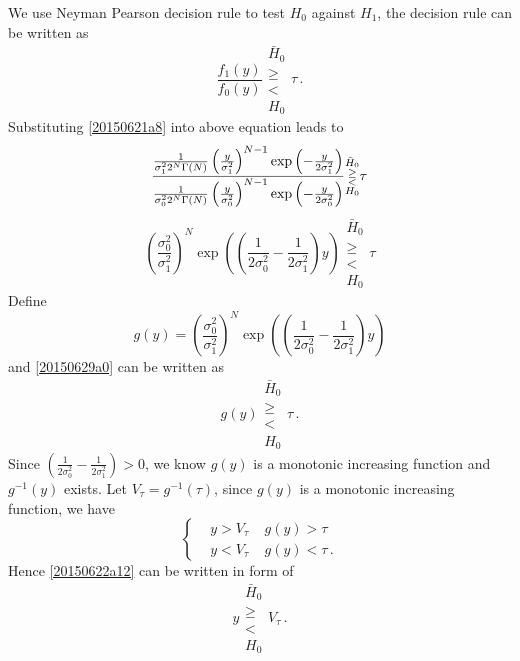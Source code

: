 We use Neyman Pearson decision rule to test $H_0$ against $H_1$, the decision rule can be written as
\begin{equation}
  \frac{f_1(y)}{f_0(y)} \substack{\bar{H}_0 \\ \geq \\ < \\ H_0} \tau\,.
\end{equation}
Substituting \eqref{20150621a8} into above equation leads to 
\begin{equation}
  \frac{\CHISQUY[\sigma_1^2]}{\CHISQUY[\sigma_0^2]}\substack{\bar{H}_0 \\ \geq \\ < \\ H_0} \tau
\end{equation}
\begin{equation}
  \left(\frac{\sigma_0^2}{\sigma_1^2}\right)^N\exp\left( (\frac{1}{2\sigma_0^2} -  \frac{1}{2\sigma_1^2}  )y \right)\substack{\bar{H}_0 \\ \geq \\ < \\ H_0} \tau
\end{equation}
Define 
\begin{equation}
  g(y) = \left(\frac{\sigma_0^2}{\sigma_1^2}\right)^N\exp\left( (\frac{1}{2\sigma_0^2} -  \frac{1}{2\sigma_1^2}  )y \right)
  \label{20150629a0}
\end{equation}
and \eqref{20150629a0} can be written as
\begin{equation}
  g(y) \substack{\bar{H}_0 \\ \geq \\ < \\ H_0} \tau\,.
  \label{20150622a12}
\end{equation}
Since $(\frac{1}{2\sigma_0^2} -  \frac{1}{2\sigma_1^2}  ) >  0$, we know $g(y)$ is a monotonic increasing function and $g^{-1}(y) $ exists.  
Let $V_\tau = g^{-1}(\tau)$, since $g(y)$ is a monotonic increasing function, we have 
\begin{equation}
  \begin{cases}
    &y > V_\tau\;\;\;\;g(y) > \tau\\
    &y < V_\tau\;\;\;\;g(y) < \tau\,.
  \end{cases}
\end{equation}
Hence \eqref{20150622a12} can be written in form of 
\begin{equation}
  y  \substack{\bar{H}_0 \\ \geq \\ < \\ H_0} V_\tau\,.
  \label{20150622a22}
\end{equation}
